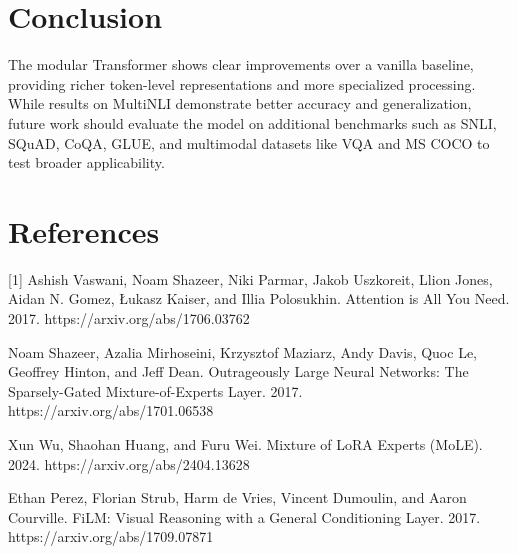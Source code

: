 \documentclass{article}
\begin{document}
\section{Conclusion}
The modular Transformer shows clear improvements over a vanilla baseline, providing richer token-level representations and more specialized processing. While results on MultiNLI demonstrate better accuracy and generalization, future work should evaluate the model on additional benchmarks such as SNLI, SQuAD, CoQA, GLUE, and multimodal datasets like VQA and MS COCO to test broader applicability.

\section{References}
[1] Ashish Vaswani, Noam Shazeer, Niki Parmar, Jakob Uszkoreit, Llion Jones, Aidan N. Gomez, Łukasz Kaiser, and Illia Polosukhin. Attention is All You Need. 2017. https://arxiv.org/abs/1706.03762

\vspace{7pt}
\noindent
[2] Noam Shazeer, Azalia Mirhoseini, Krzysztof Maziarz, Andy Davis, Quoc Le, Geoffrey Hinton, and Jeff Dean. Outrageously Large Neural Networks: The Sparsely-Gated Mixture-of-Experts Layer. 2017. https://arxiv.org/abs/1701.06538

\vspace{7pt}
\noindent
[3]
Xun Wu, Shaohan Huang, and Furu Wei. Mixture of LoRA Experts (MoLE). 2024. 
https://arxiv.org/abs/2404.13628


\vspace{7pt}
\noindent
[4]
Ethan Perez, Florian Strub, Harm de Vries, Vincent Dumoulin, and Aaron Courville. FiLM: Visual Reasoning with a General Conditioning Layer. 2017. https://arxiv.org/abs/1709.07871
\end{document}
